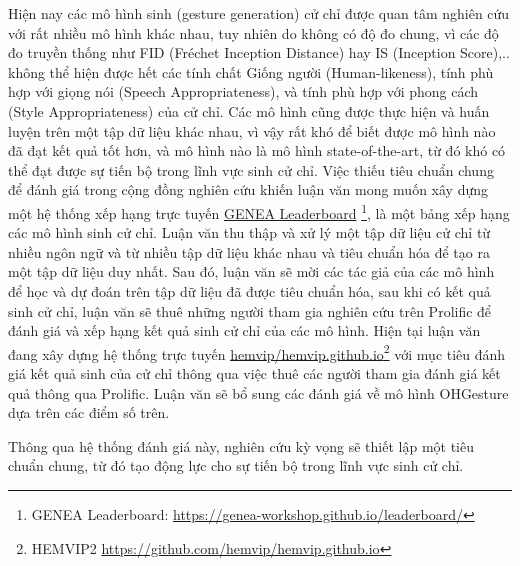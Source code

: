 Hiện nay các mô hình sinh (gesture generation) cử chỉ được quan tâm nghiên cứu với rất nhiều mô hình khác nhau, tuy nhiên do không có độ đo chung, vì các độ đo truyền thống như FID (Fréchet Inception Distance) hay IS (Inception Score),.. không thể hiện được hết các tính chất Giống người (Human-likeness), tính phù hợp với giọng nói (Speech Appropriateness), và tính phù hợp với phong cách (Style Appropriateness) của cử chỉ. Các mô hình cũng được thực hiện và huấn luyện trên một tập dữ liệu khác nhau, vì vậy rất khó để biết được mô hình nào đã đạt kết quả tốt hơn, và mô hình nào là mô hình state-of-the-art, từ đó khó có thể đạt được sự tiến bộ trong lĩnh vực sinh cử chỉ. Việc thiếu tiêu chuẩn chung để đánh giá trong cộng đồng nghiên cứu khiến luận văn mong muốn xây dựng một hệ thống xếp hạng trực tuyến \cite{nagy2024towards} \hyperlink{https://genea-workshop.github.io/leaderboard/}{GENEA Leaderboard} \footnote{GENEA Leaderboard: \url{https://genea-workshop.github.io/leaderboard/}}, là một bảng xếp hạng các mô hình sinh cử chỉ. Luận văn thu thập và xử lý một tập dữ liệu cử chỉ từ nhiều ngôn ngữ và từ nhiều tập dữ liệu khác nhau và tiêu chuẩn hóa để tạo ra một tập dữ liệu duy nhất.  Sau đó, luận văn sẽ mời các tác giả của các mô hình để học và dự đoán trên tập dữ liệu đã được tiêu chuẩn hóa, sau khi có kết quả sinh cử chỉ, luận văn sẽ thuê những người tham gia nghiên cứu trên Prolific để đánh giá và xếp hạng kết quả sinh cử chỉ của các mô hình. Hiện tại luận văn đang xây dựng hệ thống trực tuyến \hyperlink{https://github.com/hemvip/hemvip.github.io}{hemvip/hemvip.github.io}\footnote{HEMVIP2 \url{https://github.com/hemvip/hemvip.github.io}} với mục tiêu đánh giá kết quả sinh của cử chỉ thông qua việc thuê các người tham gia đánh giá kết quả thông qua Prolific. Luận văn sẽ bổ sung các đánh giá về mô hình OHGesture dựa trên các điểm số trên.


Thông qua hệ thống đánh giá này, nghiên cứu kỳ vọng sẽ thiết lập một tiêu chuẩn chung, từ đó tạo động lực cho sự tiến bộ trong lĩnh vực sinh cử chỉ.
